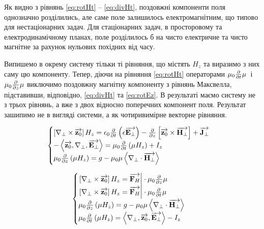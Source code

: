 Як видно з рівнянь \eqref{eq:rotHt} -- \eqref{eq:divHt}, поздовжні компоненти 
поля однозначно розділились, але саме поле залишилось електромагнітним, що типово
для нестаціонарних задач. Для стаціонарних задач, в просторовому та 
електродинамічному планах, поле розділилось б на чисто електричне та чисто
магнітне за рахунок нульових похідних від часу.

Випишемо в окрему систему тільки ті рівняння, що містять $ H_z $ та виразимо з 
них саму цю компоненту. Тепер, діючи на рівняння \eqref{eq:rotHt} операторами 
$ \mu_0 \frac{\partial }{\partial t} \mu $ і $ \mu_0 \frac{\partial }{\partial z} \mu $ виключимо поздовжну 
магнітну компоненту з рівнянь Максвелла, підставивши, відповідно, 
\eqref{eq:divHt} та \eqref{eq:rotEz}. В результаті маємо систему не з трьох 
рівнянь, а вже з двох відносно поперечних компонент поля. Результат зашипимо не 
в вигляді системи, а як чотиривимірне векторне рівняння.

\textcolor{lightgray}{ \begin{equation*} \begin{aligned}
\begin{cases} 
\left[ \nabla_\perp \times \overrightarrow{\mathbf z_0} \right] H_z =
\epsilon_0 \frac{\partial }{\partial t} \left( \epsilon \overrightarrow{\mathbf E_\perp} \right) -
\frac{\partial }{\partial z} \left[ \overrightarrow{\mathbf z_0} \times \overrightarrow{\mathbf H_\perp} \right] + \overrightarrow{\mathbf J_\perp} \\
- \left< \overrightarrow{\mathbf z_0} , \nabla_\perp , \overrightarrow{\mathbf E_\perp} \right> =
\mu_0 \frac{\partial }{\partial t} \left(\mu H_z \right) + I_z \\ 
\mu_0 \frac{\partial }{\partial z} \left( \mu H_z \right) = 
g - \mu_0 \mu \left< \nabla_\perp \cdot \overrightarrow{\mathbf H_\perp} \right>
\end{cases}
\end{aligned} \end{equation*} }

\textcolor{lightgray}{ \begin{equation*} \begin{aligned}
\begin{cases} 
\left. \left[ \nabla_\perp \times \overrightarrow{\mathbf z_0} \right] H_z = \overrightarrow{\mathbf F_H} 
\right| \cdot \mu_0 \frac{\partial }{\partial z} \mu \\
\left. \left[ \nabla_\perp \times \overrightarrow{\mathbf z_0} \right] H_z = \overrightarrow{\mathbf F_H} 
\right| \cdot \mu_0 \frac{\partial }{\partial t} \mu \\
\mu_0 \frac{\partial }{\partial z} \left( \mu H_z \right) = 
g - \mu_0 \mu \left< \nabla_\perp \cdot \overrightarrow{\mathbf H_\perp} \right> \\
\mu_0 \frac{\partial }{\partial t} \left(\mu H_z \right) =
\left< \nabla_\perp , \overrightarrow{\mathbf z_0} , \overrightarrow{\mathbf E_\perp} \right> - I_z
\end{cases}
\end{aligned} \end{equation*} }


